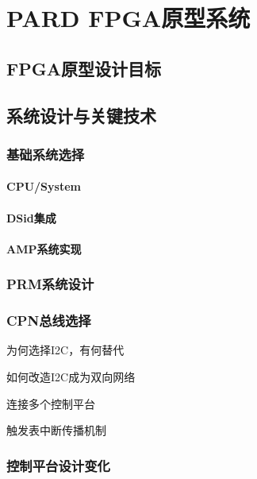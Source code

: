 

\chapter{PARD FPGA原型系统}
\label{cha:pardfpga}

\section{FPGA原型设计目标}


\section{系统设计与关键技术}

\subsection{基础系统选择}

\subsubsection*{CPU/System}
\subsubsection*{DSid集成}
\subsubsection*{AMP系统实现}


\subsection{PRM系统设计}



\subsection{CPN总线选择}

为何选择I2C，有何替代

如何改造I2C成为双向网络

连接多个控制平台

触发表中断传播机制


\subsection{控制平台设计变化}

